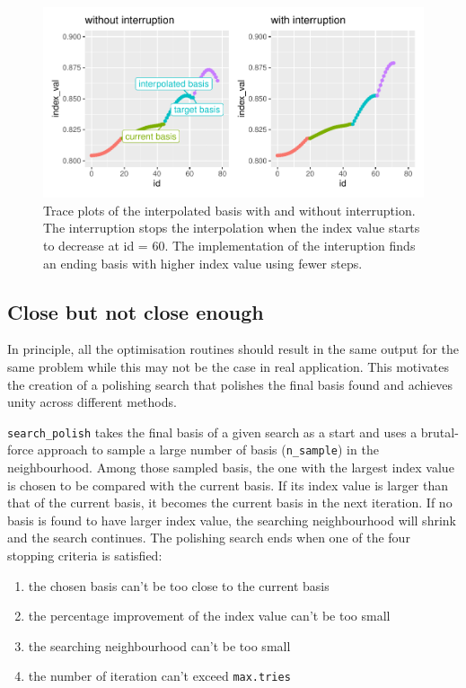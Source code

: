 \documentclass[12pt]{article}
\providecommand{\tightlist}{%
  \setlength{\itemsep}{0pt}\setlength{\parskip}{0pt}}
\begin{document}
\begin{figure}
\centering
\includegraphics{paper_files/figure-latex/interruption-1.pdf}
\caption{\label{interruption}Trace plots of the interpolated basis with
and without interruption. The interruption stops the interpolation when
the index value starts to decrease at id = 60. The implementation of the
interuption finds an ending basis with higher index value using fewer
steps.}
\end{figure}

\hypertarget{close-but-not-close-enough}{%
\subsection{Close but not close
enough}\label{close-but-not-close-enough}}

In principle, all the optimisation routines should result in the same
output for the same problem while this may not be the case in real
application. This motivates the creation of a polishing search that
polishes the final basis found and achieves unity across different
methods.

\texttt{search\_polish} takes the final basis of a given search as a
start and uses a brutal-force approach to sample a large number of basis
(\texttt{n\_sample}) in the neighbourhood. Among those sampled basis,
the one with the largest index value is chosen to be compared with the
current basis. If its index value is larger than that of the current
basis, it becomes the current basis in the next iteration. If no basis
is found to have larger index value, the searching neighbourhood will
shrink and the search continues. The polishing search ends when one of
the four stopping criteria is satisfied:

\begin{enumerate}
\def\labelenumi{\arabic{enumi})}
\tightlist
\item
  the chosen basis can't be too close to the current basis
\item
  the percentage improvement of the index value can't be too small
\item
  the searching neighbourhood can't be too small
\item
  the number of iteration can't exceed \texttt{max.tries}
\end{enumerate}
\end{document}
